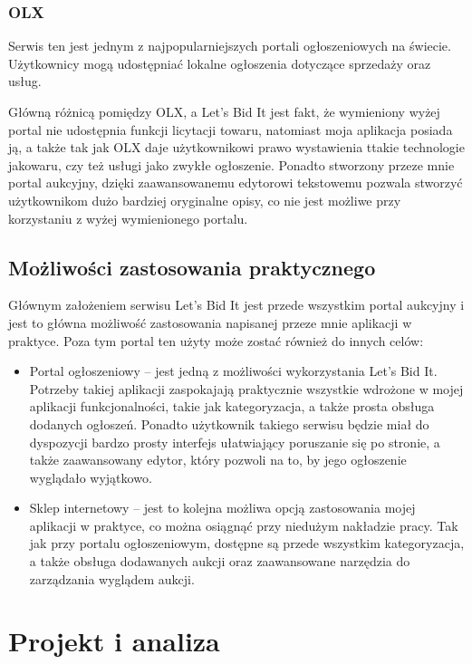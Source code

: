 \documentclass[brudnopis]{xmgr}
\begin{document}
\subsection{OLX}  

Serwis ten jest jednym z najpopularniejszych portali ogłoszeniowych na świecie. Użytkownicy
mogą udostępniać lokalne ogłoszenia dotyczące sprzedaży oraz usług.

Główną różnicą pomiędzy OLX, a Let's Bid It jest fakt,
że wymieniony wyżej portal nie udostępnia funkcji licytacji towaru, natomiast moja aplikacja posiada ją, a także tak jak OLX daje użytkownikowi prawo wystawienia ttakie technologie jakowaru, czy też usługi jako zwykłe ogłoszenie. Ponadto stworzony przeze mnie portal aukcyjny, dzięki zaawansowanemu edytorowi tekstowemu pozwala stworzyć użytkownikom dużo bardziej oryginalne opisy, co nie jest możliwe przy korzystaniu z wyżej wymienionego portalu.

\section{Możliwości zastosowania praktycznego}
Głównym założeniem serwisu Let's Bid It jest przede wszystkim portal aukcyjny i jest to główna możliwość zastosowania napisanej przeze mnie aplikacji w praktyce. Poza tym portal ten użyty może zostać również do innych celów:

\begin{itemize}

\item Portal ogłoszeniowy – jest jedną z możliwości wykorzystania Let's Bid It. Potrzeby takiej aplikacji zaspokajają praktycznie wszystkie wdrożone w mojej aplikacji funkcjonalności, takie jak kategoryzacja, a także prosta obsługa dodanych ogłoszeń. Ponadto użytkownik takiego  serwisu będzie miał do dyspozycji bardzo prosty interfejs ułatwiający poruszanie się po stronie, a także zaawansowany edytor, który pozwoli na to, by jego ogłoszenie wyglądało wyjątkowo.

\item Sklep internetowy – jest to kolejna możliwa opcją zastosowania mojej aplikacji w praktyce, co można osiągnąć przy niedużym nakładzie pracy. Tak jak przy portalu ogłoszeniowym, dostępne są przede wszystkim kategoryzacja, a także obsługa dodawanych aukcji oraz zaawansowane narzędzia do zarządzania wyglądem aukcji.

\end{itemize}

\chapter{Projekt i analiza}
\end{document}
